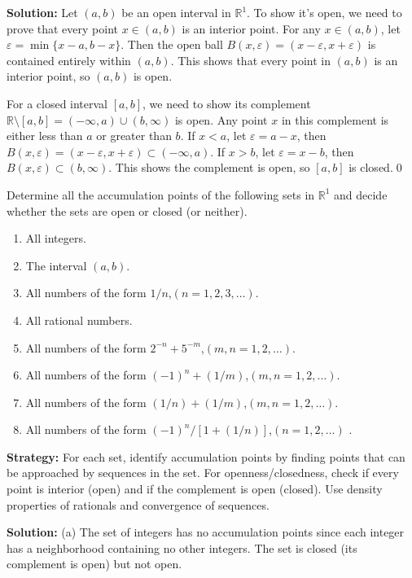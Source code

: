 \bigskip\noindent\textbf{Solution:} Let $(a,b)$ be an open interval in $\mathbb{R}^1$. To show it's open, we need to prove that every point $x \in (a,b)$ is an interior point. For any $x \in (a,b)$, let $\varepsilon = \min\{x-a, b-x\}$. Then the open ball $B(x,\varepsilon) = (x-\varepsilon, x+\varepsilon)$ is contained entirely within $(a,b)$. This shows that every point in $(a,b)$ is an interior point, so $(a,b)$ is open.

For a closed interval $[a,b]$, we need to show its complement $\mathbb{R} \setminus [a,b] = (-\infty,a) \cup (b,\infty)$ is open. Any point $x$ in this complement is either less than $a$ or greater than $b$. If $x < a$, let $\varepsilon = a-x$, then $B(x,\varepsilon) = (x-\varepsilon, x+\varepsilon) \subset (-\infty,a)$. If $x > b$, let $\varepsilon = x-b$, then $B(x,\varepsilon) \subset (b,\infty)$. This shows the complement is open, so $[a,b]$ is closed.\qed


\begin{problembox}
Determine all the accumulation points of the following sets in $\mathbb{R}^1$ and decide whether the sets are open or closed (or neither).
\begin{enumerate}[label=\textbf{(\alph*)}]
\item All integers.
\item The interval $(a, b)$.
\item All numbers of the form $1/n$,\quad $(n = 1, 2, 3, \dots)$.
\item All rational numbers.
\item All numbers of the form $2^{-n} + 5^{-m}$,\quad $(m, n = 1, 2, \dots)$.
\item All numbers of the form $(-1)^n + (1/m)$,\quad $(m, n = 1, 2, \dots)$.
\item All numbers of the form $(1/n) + (1/m)$,\quad $(m, n = 1, 2, \dots)$.
\item All numbers of the form $(-1)^n / [1 + (1/n)]$,\quad $(n = 1, 2, \dots)$
.
\end{enumerate}
\end{problembox}

\noindent\textbf{Strategy:} For each set, identify accumulation points by finding points that can be approached by sequences in the set. For openness/closedness, check if every point is interior (open) and if the complement is open (closed). Use density properties of rationals and convergence of sequences.

\bigskip\noindent\textbf{Solution:} 
(a) The set of integers has no accumulation points since each integer has a neighborhood containing no other integers. The set is closed (its complement is open) but not open.


